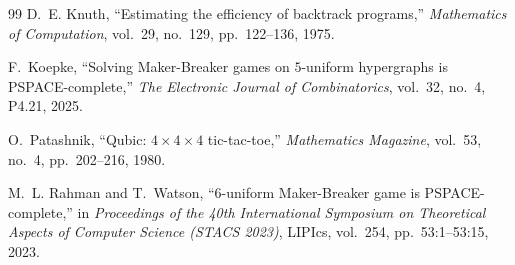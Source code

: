 \documentclass[11pt,a4paper]{article}
\theoremstyle{definition}
\theoremstyle{remark}
\begin{document}
\begin{thebibliography}{99}
D.~E. Knuth,
``Estimating the efficiency of backtrack programs,''
\emph{Mathematics of Computation}, vol.~29, no.~129, pp.~122--136, 1975.

F.~Koepke,
``Solving Maker-Breaker games on $5$-uniform hypergraphs is PSPACE-complete,''
\emph{The Electronic Journal of Combinatorics}, vol.~32, no.~4, P4.21, 2025.

O.~Patashnik,
``Qubic: $4 \times 4 \times 4$ tic-tac-toe,''
\emph{Mathematics Magazine}, vol.~53, no.~4, pp.~202--216, 1980.

M.~L. Rahman and T.~Watson,
``$6$-uniform Maker-Breaker game is PSPACE-complete,''
in \emph{Proceedings of the 40th International Symposium on Theoretical Aspects of Computer Science (STACS 2023)}, LIPIcs, vol.~254, pp.~53:1--53:15, 2023.

\end{thebibliography}
\end{document}
